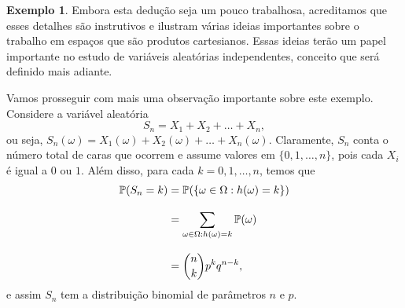 \documentclass[12pt,portuguese]{article}
\theoremstyle{definition}
\newtheorem{example}[example]{Exemplo}
\begin{document}
\begin{example}
  Embora esta dedução seja um pouco trabalhosa, acreditamos que esses detalhes
  são instrutivos e ilustram várias ideias importantes sobre o trabalho em
  espaços que são produtos cartesianos. Essas ideias terão um papel importante
  no estudo de variáveis aleatórias independentes, conceito que será definido
  mais adiante.

  Vamos prosseguir com mais uma observação importante sobre este exemplo. Considere a variável aleatória
  \[
    S_n = X_1 + X_2 + \dots + X_n,
  \]
  ou seja, \(S_n(\omega) = X_1(\omega) + X_2(\omega) + \dots + X_n(\omega)\).
  Claramente, \(S_n\) conta o número total de caras que ocorrem e assume
  valores em \(\{0, 1, \dots, n\}\), pois cada \(X_i\) é igual a \(0\) ou
  \(1\). Além disso, para cada \(k = 0, 1, \dots, n\), temos que
  \begin{align}
    \mathbb{P}(S_n = k) &= \mathbb{P}(\{\omega \in \Omega : h(\omega) = k\})
      \notag
    \\[0.3cm]
    &= \sum_{\omega\in \Omega : h(\omega) = k} \mathbb{P}(\omega) \notag
    \\[0.3cm]
    &= \binom{n}{k} p^k q^{n-k}, \label{eq:sn-binomial}
  \end{align}
  e assim \(S_n\) tem a distribuição binomial de parâmetros \(n\) e \(p\).


\bigskip


\end{example}
\end{document}
